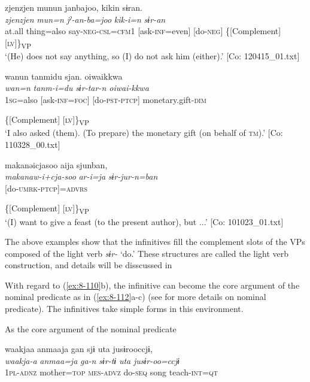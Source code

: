 \ea
{\TM}
\glll  zjenzjen  munun  janbajoo,  kikin  sɨran.\\
\textit{zjenzjen}  \textit{mun=n}  \textit{jˀ-an-ba=joo}  \textit{kik-i=n}  \textit{sɨr-an}\\
at.all  thing=also  say-\textsc{neg}-\textsc{csl}=\textsc{cfm1}  [ask-\textsc{inf}=even]  [do-\textsc{neg}]
            \{[Complement]  [\textsc{lv}]\}\textsubscript{VP}\\
\glt ‘(He) does not say anything, so (I) do not ask him (either).’ [Co: 120415\_01.txt]

\ex {\TM}
\glll  wanun  tanmidu  sjan.  {\textbar}oiwai{\textbar}kkwa\\
\textit{wan=n}  \textit{tanm-i=du}  \textit{sɨr-tar-n  oiwai-kkwa}\\
1\textsc{sg}=also  [ask-\textsc{inf}=\textsc{foc}]  [do-\textsc{pst}-\textsc{ptcp}]  monetary.gift-\textsc{dim}

        \{[Complement]  [\textsc{lv}]\}\textsubscript{VP}\\
\glt ‘I also asked (them). (To prepare) the monetary gift (on behalf of \textsc{tm}).’ [Co: 110328\_00.txt]

\ex {\TM}
\glll  makanəicjasoo  aija  sjunban,\\
\textit{makanaw-i+cja-soo}  \textit{ar-i=ja}  \textit{sɨr-jur-n=ban}\\
[give.a.feast-\textsc{ing}+want-\textsc{adj}  \textsc{stv}-\textsc{inf}=\textsc{top}]  [do-\textsc{umrk}-\textsc{ptcp}]=\textsc{advrs}

      \{[Complement]    [\textsc{lv}]\}\textsubscript{VP}\\
\glt ‘(I) want to give a feast (to the present author), but ...’ [Co: 101023\_01.txt]
\z
\z

The above examples show that the infinitives fill the complement slots of the VPs composed of the light verb \textit{sɨr-} ‘do.’ These structures are called the light verb construction, and details will be disscussed in 

  With regard to (\ref{ex:8-110}b), the infinitive can become the core argument of the nominal predicate as in (\ref{ex:8-112}a-c) (see  for more details on nominal predicate). The infinitives take simple forms in this environment.

\ea\label{ex:8-112}
  As the core argument of the nominal predicate

\ea
{\TM}
\glll  waakjaa  anmaaja  gan  sjɨ  uta  jusɨrooccjɨ,\\
\textit{waakja-a}  \textit{anmaa=ja}  \textit{ga-n}  \textit{sɨr-tɨ}  \textit{uta}  \textit{jusɨr-oo=ccjɨ}\\
1\textsc{pl}-\textsc{adnz}  mother=\textsc{top}  \textsc{mes}-\textsc{advz}  do-\textsc{seq}  song  teach-\textsc{int}=\textsc{qt}

